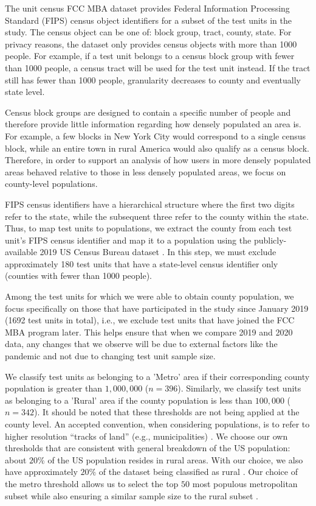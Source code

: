 \documentclass[conference,10pt]{IEEEtran}
\begin{document}
The unit census FCC MBA dataset provides Federal Information Processing Standard (FIPS) census object identifiers for a subset of the test units in the study. The census object can be one of: block group, tract, county, state. For privacy reasons, the dataset only provides census objects with more than 1000 people. For example, if a test unit belongs to a census block group with fewer than 1000 people, a census tract will be used for the test unit instead. If the tract still has fewer than 1000 people, granularity decreases to county and eventually state level.

Census block groups are designed to contain a specific number of people and therefore provide little information regarding how densely populated an area is. For example, a few blocks in New York City would correspond to a single census block, while an entire town in rural America would also qualify as a census block. Therefore, in order to support an analysis of how users in more densely populated areas behaved relative to those in less densely populated areas, we focus on county-level populations.

FIPS census identifiers have a hierarchical structure where the first two digits refer to the state, while the subsequent three refer to the county within the state. Thus, to map test units to populations, we extract the county from each test unit's FIPS census identifier and map it to a population using the publicly-available 2019 US Census Bureau dataset \cite{census}. In this step, we must exclude approximately 180 test units that have a state-level census identifier only (counties with fewer than 1000 people).

Among the test units for which we were able to obtain county population, we focus specifically on those that have participated in the study since January 2019 (1692 test units in total), i.e., we exclude test units that have joined the FCC MBA program later. This helps ensure that when we compare 2019 and 2020 data, any changes that we observe will be due to external factors like the pandemic and not due to changing test unit sample size.

We classify test units as belonging to a 'Metro' area if their corresponding county population is greater than $1,000,000$ ($n=396$). Similarly, we classify test units as belonging to a 'Rural' area if the county population is less than $100,000$ ($n=342$). It should be noted that these thresholds are not being applied at the county level. An accepted convention, when considering populations, is to refer to higher resolution ``tracks of land'' (e.g., municipalities) \cite{censusMSA}. We choose our own thresholds that are consistent with general breakdown of the US population: about $20\%$ of the US population resides in rural areas. With our choice, we also have approximately $20\%$ of the dataset being classified as rural \cite{metroRural}. Our choice of the metro threshold allows us to select the top $50$ most populous metropolitan subset while also ensuring a similar sample size to the rural subset \cite{censusMSA}.
\end{document}
